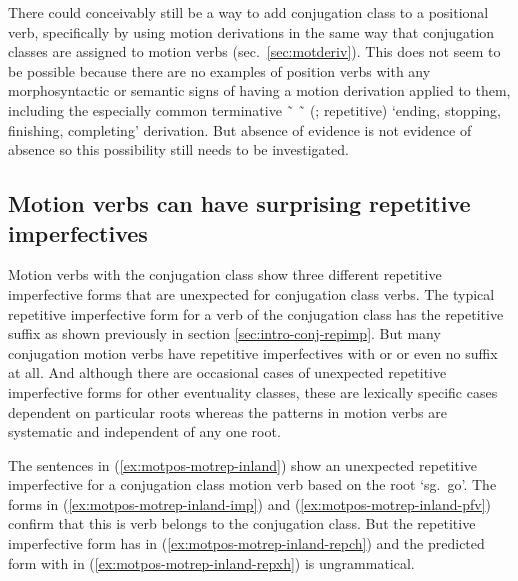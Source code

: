 \documentclass[12pt,letterpaper,oneside,article]{memoir}
\begin{document}
There could conceivably still be a way to add conjugation class to a positional verb, specifically by using motion derivations in the same way that conjugation classes are assigned to motion verbs (sec.\ \ref{sec:motderiv}).
This does not seem to be possible because there are no examples of position verbs with any morphosyntactic or semantic signs of having a motion derivation applied to them, including the especially common terminative  \~\  \~\  (;  repetitive) ‘ending, stopping, finishing, completing’ derivation.
But absence of evidence is not evidence of absence so this possibility still needs to be investigated.

\subsection{Motion verbs can have surprising repetitive imperfectives}\label{sec:motpos-motrep}

Motion verbs with the  conjugation class show three different repetitive imperfective forms that are unexpected for  conjugation class verbs.
The typical repetitive imperfective form for a verb of the  conjugation class has the repetitive suffix  as shown previously in section \ref{sec:intro-conj-repimp}.
But many  conjugation motion verbs have repetitive imperfectives with  or  or even no suffix at all.
And although there are occasional cases of unexpected repetitive imperfective forms for other eventuality classes, these are lexically specific cases dependent on particular roots whereas the patterns in motion verbs are systematic and independent of any one root.

The sentences in (\ref{ex:motpos-motrep-inland}) show an unexpected  repetitive imperfective for a  conjugation class motion verb based on the root  ‘sg.\ go’.
The forms in (\ref{ex:motpos-motrep-inland-imp}) and (\ref{ex:motpos-motrep-inland-pfv}) confirm that this is verb belongs to the  conjugation class.
But the repetitive imperfective form has  in (\ref{ex:motpos-motrep-inland-repch}) and the predicted form with  in (\ref{ex:motpos-motrep-inland-repxh}) is ungrammatical.
\end{document}
